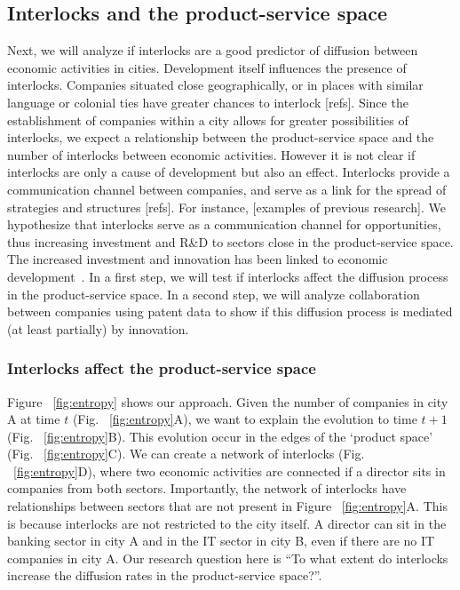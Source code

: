 \subsection{Interlocks and the product-service space}
\label{sec:interlockspss}
Next, we will analyze if interlocks are a good predictor of diffusion between economic activities in cities. 
Development itself influences the presence of interlocks.
Companies situated close geographically, or in places with similar language or colonial ties 
have greater chances to interlock [refs].
Since the establishment of companies within a city allows for greater possibilities of interlocks,
we expect a relationship between the product-service space and the number of interlocks between economic activities.
However it is not clear if interlocks are only a cause of development but also an effect.
Interlocks provide a communication channel between companies, 
and serve as a link for the spread of strategies and structures [refs].
For instance, [examples of previous research].
We hypothesize that interlocks serve as a communication channel for opportunities,
thus increasing investment and R\&D to sectors close in the product-service space.
The increased investment and innovation has been linked to economic development~\citep{Romer1991,grossman1991,hidalgo2007}.
In a first step, we will test if interlocks affect the diffusion process in the product-service space.
In a second step, we will analyze collaboration between companies using patent data to show if this diffusion process is mediated (at least partially) by innovation.

\subsubsection{Interlocks affect the product-service space}
Figure ~\ref{fig:entropy} shows our approach. 
Given the number of companies in city A at time $t$ (Fig. ~\ref{fig:entropy}A), 
we want to explain the evolution to time $t+1$ (Fig. ~\ref{fig:entropy}B).
This evolution occur in the edges of the `product space' (Fig. ~\ref{fig:entropy}C).
We can create a network of interlocks (Fig. ~\ref{fig:entropy}D),
where two economic activities are connected if a director sits in companies from both sectors.
Importantly, the network of interlocks have relationships between sectors that are not present in Figure ~\ref{fig:entropy}A. 
This is because interlocks are not restricted to the city itself.
A director can sit in the banking sector in city A and in the IT sector in city B, even if there are no IT companies in city A.
Our research question here is ``To what extent do interlocks increase the diffusion rates in the product-service space?''.


